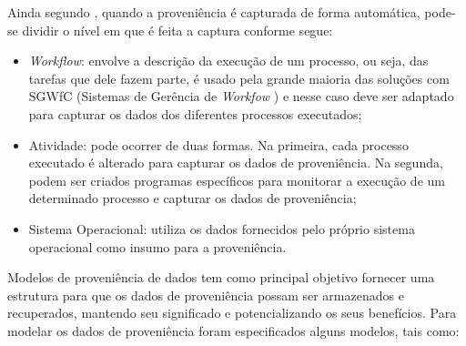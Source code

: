 Ainda segundo \cite{davidson}, quando a proveniência é capturada de forma automática, pode-se dividir o nível em que é feita a captura conforme segue:
\begin{itemize}
\item \textit{Workflow}: envolve a descrição da execução de um processo, ou seja,  das tarefas que dele fazem parte, é usado pela grande maioria das soluções com SGWfC (Sistemas de Gerência de \textit{Workfow} ) e nesse caso deve ser adaptado para capturar os dados dos diferentes processos executados;
\item Atividade: pode ocorrer de duas formas. Na primeira, cada processo executado é alterado para capturar os dados de proveniência. Na segunda, podem ser criados programas específicos para monitorar a execução de um determinado processo e capturar os dados de proveniência;
\item Sistema Operacional: utiliza os dados fornecidos pelo próprio sistema operacional como insumo para a proveniência.
\end{itemize}

Modelos de proveniência de dados tem como principal objetivo fornecer uma estrutura para que os dados de proveniência possam ser armazenados e recuperados, mantendo seu significado e potencializando os seus benefícios. Para modelar os dados de proveniência foram especificados alguns modelos, tais como:

